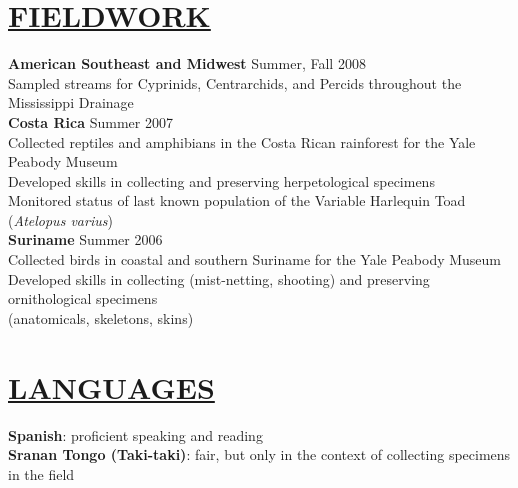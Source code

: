 \documentclass{res}
\begin{document}
\begin{resume}
\section{\underline{FIELDWORK}}
\textbf{American Southeast and Midwest} Summer, Fall 2008\\ \vspace{0.3mm}
\hspace{4.5mm}Sampled streams for Cyprinids, Centrarchids, and Percids throughout the Mississippi Drainage\\
\textbf{Costa Rica} Summer 2007\\ \vspace{0.3mm}
\hspace{4.5mm}Collected reptiles and amphibians in the Costa Rican rainforest for the Yale Peabody Museum\\ \vspace{0.3mm}
\hspace{4.5mm}Developed skills in collecting and preserving herpetological specimens\\\vspace{0.3mm}
\hspace{4.5mm}Monitored status of last known population of the Variable Harlequin Toad (\textit{Atelopus varius})\\
\textbf{Suriname} Summer 2006\\ \vspace{0.3mm}
\hspace{4.5mm}Collected birds in coastal and southern Suriname for the Yale Peabody Museum\\ \vspace{0.3mm}
\hspace{4.5mm}Developed skills in collecting (mist-netting, shooting) and preserving ornithological specimens\\ \vspace{0.3mm} 
\hspace{4.5mm}(anatomicals, skeletons, skins)\\ 





\section{\underline{LANGUAGES}}
\textbf{Spanish}: proficient speaking and reading\\
\textbf{Sranan Tongo (Taki-taki)}: fair, but only in the context of collecting specimens in the field



\end{resume}
\end{document}

